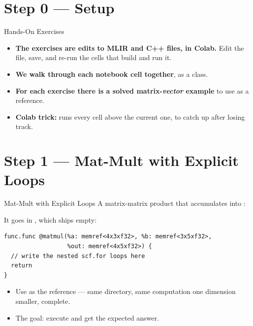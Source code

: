 \documentclass[aspectratio=169,10pt]{beamer}
\begin{document}
\section{Step 0 --- Setup}
\begin{frame}[plain]
  \sectionpage
\end{frame}

\begin{frame}{Hands-On Exercises}
  \begin{itemize}
    \item<1-> \textbf{The exercises are edits to MLIR and C++ files, in Colab.}
      Edit the file, save, and re-run the cells that build and run it.
    \item<2-> \textbf{We walk through each notebook cell together}, as a
      class.
    \item<3-> \textbf{For each exercise there is a solved
      matrix-\emph{vector} example} to use as a reference.
    \item<4-> \textbf{Colab trick:}  runs every cell above the
      current one, to catch up after losing track.
  \end{itemize}
\end{frame}

\section{Step 1 --- Mat-Mult with Explicit Loops}
\begin{frame}[plain]\sectionpage\end{frame}

\begin{frame}[fragile]{Mat-Mult with Explicit Loops}
  A matrix-matrix product that accumulates into :
  \begin{center}
  \end{center}
  It goes in , which ships empty:
\begin{lstlisting}[language=mlir]
func.func @matmul(%a: memref<4x3xf32>, %b: memref<3x5xf32>,
                  %out: memref<4x5xf32>) {
  // write the nested scf.for loops here
  return
}
\end{lstlisting}

  \vspace{0.3em}
  \begin{itemize}
    \item<2-> Use \alert{} as the reference --- same
      directory, same computation one dimension smaller, complete.
    \item<3-> The goal: \alert{execute}  and get the expected
      answer.
  \end{itemize}
\end{frame}
\end{document}
